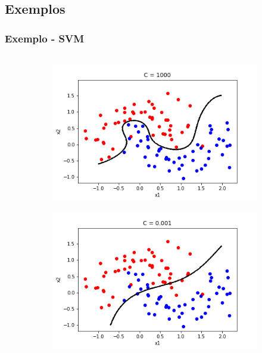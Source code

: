 \documentclass{beamer}
\begin{document}
\subsection{Exemplos}
\begin{frame}
	\frametitle{Exemplo - SVM}
	\begin{columns}
		\begin{column}{0.5\textwidth}  
			\begin{figure}
				\centering
				\begin{subfigure}[h!]{1\textwidth}
					\centering
					\includegraphics[width=\linewidth]{fig08.png}
					\label{fig:c-1000}
				\end{subfigure}
				\begin{subfigure}[h!]{1\textwidth}
					\centering
					\includegraphics[width=\linewidth]{fig09.png}
					\label{fig:c-0.001}
				\end{subfigure}

\end{figure}
\end{column}
\end{columns}
\end{frame}
\end{document}

